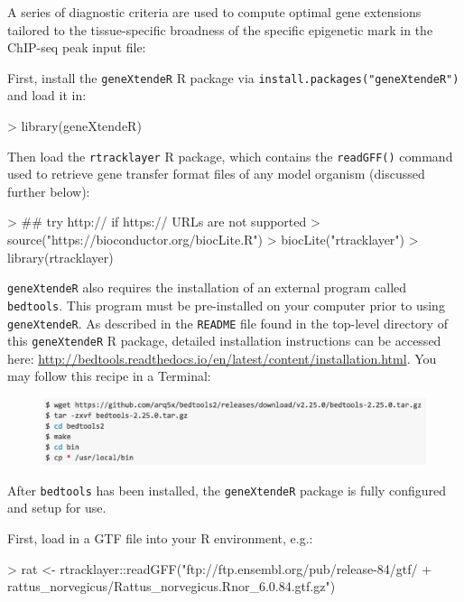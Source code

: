\documentclass[12pt]{article}
\begin{document}
A series of diagnostic criteria are used to compute optimal gene extensions tailored to the tissue-specific broadness of the specific epigenetic mark in the ChIP-seq peak input file:

First, install the \texttt{geneXtendeR} R package via \texttt{install.packages("geneXtendeR")} and load it in:

\begin{Schunk}
\begin{Sinput}
> library(geneXtendeR)
\end{Sinput}
\end{Schunk}

Then load the \texttt{rtracklayer} R package, which contains the \texttt{readGFF()} command used to retrieve gene transfer format files of any model organism (discussed further below):

\begin{Schunk}
\begin{Sinput}
> ## try http:// if https:// URLs are not supported
> source("https://bioconductor.org/biocLite.R")
> biocLite("rtracklayer")
> library(rtracklayer)
\end{Sinput}
\end{Schunk}

\texttt{geneXtendeR} also requires the installation of an external program called \texttt{bedtools}.  This program must be pre-installed on your computer prior to using \texttt{geneXtendeR}.  As described in the \texttt{README} file found in the top-level directory of this \texttt{geneXtendeR} R package, detailed installation instructions can be accessed here: \url{http://bedtools.readthedocs.io/en/latest/content/installation.html}.  You may follow this recipe in a Terminal:

\begin{figure}[H]
\centering
\includegraphics{figures/bedtoolsInstallation.png}
\end{figure}

After \texttt{bedtools} has been installed, the \texttt{geneXtendeR} package is fully configured and setup for use. 

First, load in a GTF file into your R environment, e.g.:

\begin{Schunk}
\begin{Sinput}
> rat <- rtracklayer::readGFF("ftp://ftp.ensembl.org/pub/release-84/gtf/
+                       rattus_norvegicus/Rattus_norvegicus.Rnor_6.0.84.gtf.gz")
\end{Sinput}
\end{Schunk}
\end{document}
